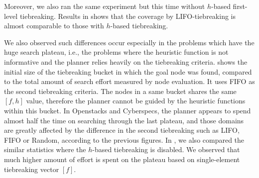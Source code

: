 Moreover, we also ran the same experiment but this time without $h$-based
first-level tiebreaking. Results in  shows that the
coverage by LIFO-tiebreaking is almost comparable to those with $h$-based
tiebreaking.


% 
%  

We also observed such differences occur especially in the problems which
have the huge search plateau, i.e., the problems where the heuristic
function is not informative and the planner relies heavily on the
tiebreaking criteria.   shows the initial size of the
tiebreaking bucket in which the goal node was found, compared to the
total amount of search effort measured by node evaluation. It uses FIFO
as the second tiebreaking criteria.  The nodes in a same bucket shares
the same $[f,h]$ value, therefore the planner cannot be guided by the
heuristic functions within this bucket. In Openstacks and Cyberspecs, the planner
appears to spend almost half the time on searching through the last
plateau, and those domains are greatly affected by the difference in the
second tiebreaking such as LIFO, FIFO or Random, according to the
previous figures.
In , we also compared the similar statistics where the $h$-based tiebreaking is disabled. We observed that much higher amount of effort is spent on the plateau based on single-element tiebreaking vector $[f]$.

